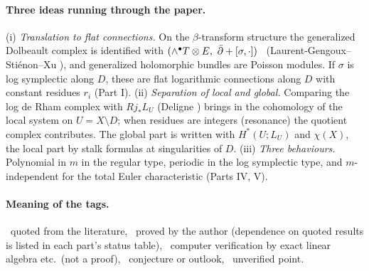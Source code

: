 \paragraph{Three ideas running through the paper.}
(i) \emph{Translation to flat connections.} On the $\beta$-transform structure the generalized Dolbeault complex is identified with $(\wedge^\bullet T\otimes E,\ \dbar+[\sigma,\cdot])$ \tC\ (Laurent-Gengoux--Sti\'enon--Xu \cite{LGSX1}), and generalized holomorphic bundles are Poisson modules. If $\sigma$ is log symplectic along $D$, these are flat logarithmic connections along $D$ with constant residues $r_i$ (Part I).
(ii) \emph{Separation of local and global.} Comparing the log de Rham complex with $Rj_*L_U$ (Deligne \cite{Del}) brings in the cohomology of the local system on $U=X\setminus D$; when residues are integers (resonance) the quotient complex contributes. The global part is written with $H^*(U;L_U)$ and $\chi(X)$, the local part by stalk formulas at singularities of $D$.
(iii) \emph{Three behaviours.} Polynomial in $m$ in the regular type, periodic in the log symplectic type, and $m$-independent for the total Euler characteristic (Parts IV, V).

\paragraph{Meaning of the tags.}\tC\ quoted from the literature, \tP\ proved by the author (dependence on quoted results is listed in each part's status table), \tV\ computer verification by exact linear algebra etc.\ (not a proof), \tK\ conjecture or outlook, \tQ\ unverified point.

